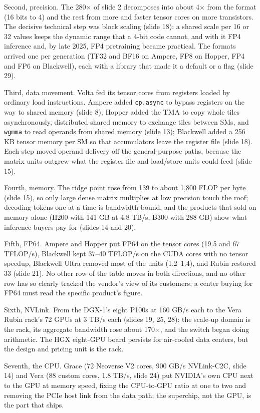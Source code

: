 \documentclass[11pt,letterpaper]{article}
\begin{document}
Second, precision. The 280$\times$ of slide 2 decomposes into about 4$\times$ from the format (16 bits to 4) and the rest from more and faster tensor cores on more transistors. The decisive technical step was block scaling (slide 18): a shared scale per 16 or 32 values keeps the dynamic range that a 4-bit code cannot, and with it FP4 inference and, by late 2025, FP4 pretraining became practical. The formats arrived one per generation (TF32 and BF16 on Ampere, FP8 on Hopper, FP4 and FP6 on Blackwell), each with a library that made it a default or a flag (slide 29).

Third, data movement. Volta fed its tensor cores from registers loaded by ordinary load instructions. Ampere added \texttt{cp.async} to bypass registers on the way to shared memory (slide 8); Hopper added the TMA to copy whole tiles asynchronously, distributed shared memory to exchange tiles between SMs, and \texttt{wgmma} to read operands from shared memory (slide 13); Blackwell added a 256 KB tensor memory per SM so that accumulators leave the register file (slide 18). Each step moved operand delivery off the general-purpose paths, because the matrix units outgrew what the register file and load/store units could feed (slide 15).

Fourth, memory. The ridge point rose from 139 to about 1,800 FLOP per byte (slide 15), so only large dense matrix multiplies at low precision touch the roof; decoding tokens one at a time is bandwidth-bound, and the products that sold on memory alone (H200 with 141 GB at 4.8 TB/s, B300 with 288 GB) show what inference buyers pay for (slides 14 and 20).

Fifth, FP64. Ampere and Hopper put FP64 on the tensor cores (19.5 and 67 TFLOP/s), Blackwell kept 37--40 TFLOP/s on the CUDA cores with no tensor speedup, Blackwell Ultra removed most of the units (1.2--1.4), and Rubin restored 33 (slide 21). No other row of the table moves in both directions, and no other row has so clearly tracked the vendor's view of its customers; a center buying for FP64 must read the specific product's figure.

Sixth, NVLink. From the DGX-1's eight P100s at 160 GB/s each to the Vera Rubin rack's 72 GPUs at 3 TB/s each (slides 19, 25, 28): the scale-up domain is the rack, its aggregate bandwidth rose about 170$\times$, and the switch began doing arithmetic. The HGX eight-GPU board persists for air-cooled data centers, but the design and pricing unit is the rack.

Seventh, the CPU. Grace (72 Neoverse V2 cores, 900 GB/s NVLink-C2C, slide 14) and Vera (88 custom cores, 1.8 TB/s, slide 24) put NVIDIA's own CPU next to the GPU at memory speed, fixing the CPU-to-GPU ratio at one to two and removing the PCIe host link from the data path; the superchip, not the GPU, is the part that ships.
\end{document}
